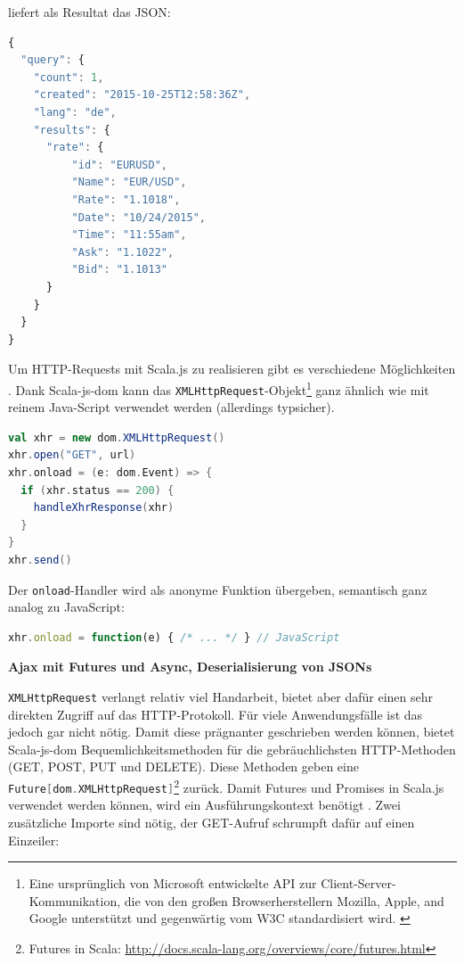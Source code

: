 \documentclass[a4paper, 12pt, hidelinks, listof=totoc, listoftables=totoc, bibliography=totoc]{scrreprt}
\newcommand{\code}[1]{\lstinline[language=Scala, style=inline]|#1|}
\newcommand{\scala}[1]{\lstinline[language=Scala, style=inline]|#1|}
\newcommand{\MyMiniSec}[1]{\rmfamily\fontsize{12}{15}\selectfont
	\vspace{7pt}\textbf{#1} %
}
\begin{document}
liefert als Resultat das \ac{JSON}:

\begin{lstlisting}[language=JavaScript, style=snippet]
{
  "query": {
    "count": 1,
    "created": "2015-10-25T12:58:36Z",
    "lang": "de",
    "results": {
      "rate": {
          "id": "EURUSD",
          "Name": "EUR/USD",
          "Rate": "1.1018",
          "Date": "10/24/2015",
          "Time": "11:55am",
          "Ask": "1.1022",
          "Bid": "1.1013"
      }
    }
  }
}
\end{lstlisting}

Um \ac{HTTP}-Requests mit Scala.js zu realisieren gibt es verschiedene Möglichkeiten \cite[\#UsingWebServices]{haoyi.HOS}. Dank Scala-js-dom kann das \code{XMLHttpRequest}-Objekt\footnote{Eine ursprünglich von Microsoft entwickelte \ac{API} zur Client-Server-Kommunikation, die von den großen Browserherstellern Mozilla, Apple, and Google unterstützt und gegenwärtig vom \ac{W3C} standardisiert wird. \cite{mdn.XHR}} ganz ähnlich wie mit reinem Java-Script verwendet werden (allerdings typsicher).

\begin{lstlisting}[language=Scala, caption={HTTP-Aufruf mit XMLHttpRequest.}]
val xhr = new dom.XMLHttpRequest()
xhr.open("GET", url)
xhr.onload = (e: dom.Event) => {
  if (xhr.status == 200) {
    handleXhrResponse(xhr)
  }
}
xhr.send()
\end{lstlisting}

Der \scala{onload}-Handler wird als anonyme Funktion übergeben, semantisch ganz analog zu JavaScript:

\begin{lstlisting}[language=JavaScript, style=snippet]
xhr.onload = function(e) { /* ... */ } // JavaScript
\end{lstlisting}


\MyMiniSec{Ajax mit Futures und Async, Deserialisierung von JSONs}

\code{XMLHttpRequest} verlangt relativ viel Handarbeit, bietet aber dafür einen sehr direkten Zugriff auf das \ac{HTTP}-Protokoll. Für viele Anwendungsfälle ist das jedoch gar nicht nötig. Damit diese prägnanter geschrieben werden können, bietet Scala-js-dom Bequemlichkeitsmethoden für die gebräuchlichsten \ac{HTTP}-Methoden (GET, POST, PUT und DELETE). Diese Methoden geben eine \scala{Future[dom.XMLHttpRequest]}\footnote{Futures in Scala: \url{http://docs.scala-lang.org/overviews/core/futures.html}} zurück. Damit Futures und Promises in Scala.js verwendet werden können, wird ein Ausführungskontext benötigt \cite[\#Extensions]{scala-js-dom.DOC}. Zwei zusätzliche Importe sind nötig, der GET-Aufruf schrumpft dafür auf einen Einzeiler:
\end{document}
